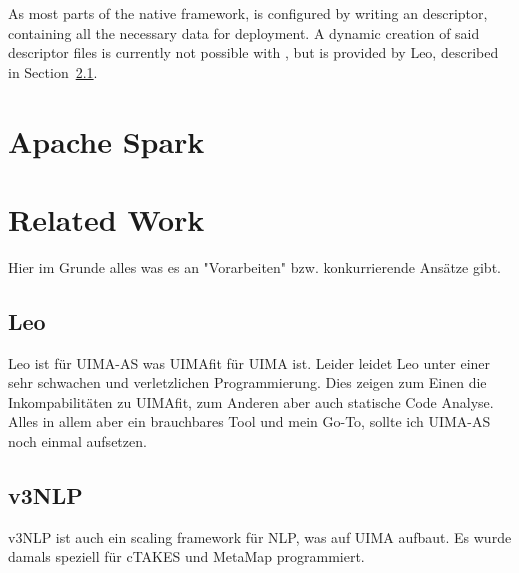 As most parts of the native \uima{} framework, \uimaas{} is configured by writing an \xml{} descriptor, containing all the necessary data for deployment. A dynamic creation of said descriptor files is currently not possible with \uimafit{}, but is provided by Leo, described in Section~\ref{ssec:leo}.

\section{Apache Spark}


\section{Related Work}
\label{sec:related}
Hier im Grunde alles was es an "Vorarbeiten" bzw. konkurrierende Ansätze gibt.

\subsection{Leo}
\label{ssec:leo}
Leo ist für UIMA-AS was UIMAfit für UIMA ist. Leider leidet Leo unter einer sehr schwachen und verletzlichen Programmierung. Dies zeigen zum Einen die Inkompabilitäten zu UIMAfit, zum Anderen aber auch statische Code Analyse. Alles in allem aber ein brauchbares Tool und mein Go-To, sollte ich UIMA-AS noch einmal aufsetzen.

\subsection{v3NLP}
v3NLP ist auch ein scaling framework für NLP, was auf UIMA aufbaut. Es wurde damals speziell für cTAKES und MetaMap programmiert.



% 
% 
% 
